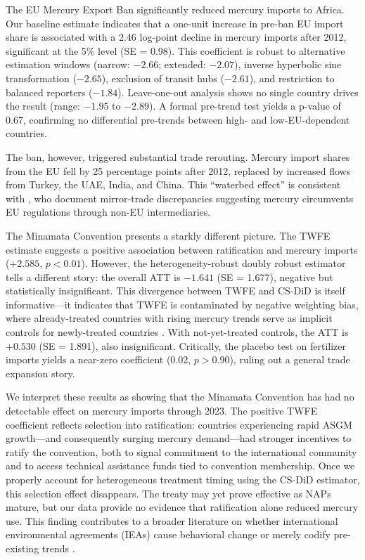 \documentclass[12pt]{article}
\begin{document}
The EU Mercury Export Ban significantly reduced mercury imports to Africa. Our baseline estimate indicates that a one-unit increase in pre-ban EU import share is associated with a 2.46 log-point decline in mercury imports after 2012, significant at the 5\% level (SE = 0.98). This coefficient is robust to alternative estimation windows (narrow: $-2.66$; extended: $-2.07$), inverse hyperbolic sine transformation ($-2.65$), exclusion of transit hubs ($-2.61$), and restriction to balanced reporters ($-1.84$). Leave-one-out analysis shows no single country drives the result (range: $-1.95$ to $-2.89$). A formal pre-trend test yields a p-value of 0.67, confirming no differential pre-trends between high- and low-EU-dependent countries.

The ban, however, triggered substantial trade rerouting. Mercury import shares from the EU fell by 25 percentage points after 2012, replaced by increased flows from Turkey, the UAE, India, and China. This ``waterbed effect'' is consistent with \citet{fritz2022smuggling}, who document mirror-trade discrepancies suggesting mercury circumvents EU regulations through non-EU intermediaries.

The Minamata Convention presents a starkly different picture. The TWFE estimate suggests a positive association between ratification and mercury imports ($+2.585$, $p < 0.01$). However, the heterogeneity-robust \citet{callaway2021difference} doubly robust estimator tells a different story: the overall ATT is $-1.641$ (SE = 1.677), negative but statistically insignificant. This divergence between TWFE and CS-DiD is itself informative---it indicates that TWFE is contaminated by negative weighting bias, where already-treated countries with rising mercury trends serve as implicit controls for newly-treated countries \citep{goodmanbacon2021difference}. With not-yet-treated controls, the ATT is $+0.530$ (SE = 1.891), also insignificant. Critically, the placebo test on fertilizer imports yields a near-zero coefficient (0.02, $p > 0.90$), ruling out a general trade expansion story.

We interpret these results as showing that the Minamata Convention has had no detectable effect on mercury imports through 2023. The positive TWFE coefficient reflects selection into ratification: countries experiencing rapid ASGM growth---and consequently surging mercury demand---had stronger incentives to ratify the convention, both to signal commitment to the international community and to access technical assistance funds tied to convention membership. Once we properly account for heterogeneous treatment timing using the CS-DiD estimator, this selection effect disappears. The treaty may yet prove effective as NAPs mature, but our data provide no evidence that ratification alone reduced mercury use. This finding contributes to a broader literature on whether international environmental agreements (IEAs) cause behavioral change or merely codify pre-existing trends \citep{bernauer2013international, aisbett2010treaty, mitchell2011mercury}.
\end{document}
